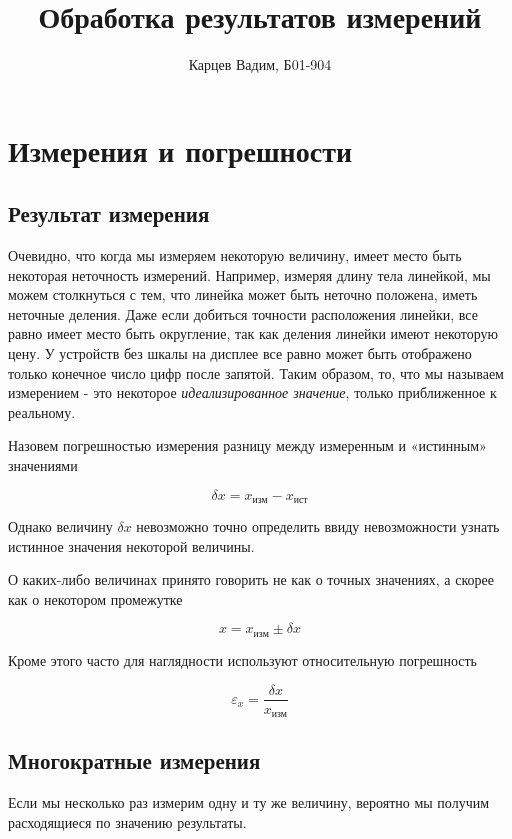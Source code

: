 \documentclass[12pt]{article}
\author{Карцев Вадим, Б01-904}            %
\title{Обработка результатов измерений}
\begin{document}
  \maketitle

  \newpage

  \section{Измерения и погрешности}

    \subsection{Результат измерения}

      Очевидно, что когда мы измеряем некоторую величину, имеет место быть некоторая
      неточность измерений. Например, измеряя длину тела линейкой, мы можем столкнуться
      с тем, что линейка может быть неточно положена, иметь неточные деления.
      Даже если добиться точности расположения линейки, все равно имеет место быть округление,
      так как деления линейки имеют некоторую цену. У устройств без шкалы на дисплее
      все равно может быть отображено только конечное число цифр после запятой.
      Таким образом, то, что мы называем измерением - это некоторое \textit{идеализированное значение},
      только приближенное к реальному.

      Назовем погрешностью измерения разницу между измеренным и «истинным» значениями

      $$
        \delta x = x_{изм} - x_{ист}
      $$

      Однако величину $\delta x$ невозможно точно определить ввиду невозможности
      узнать истинное значения некоторой величины.

      О каких-либо величинах принято говорить не как о точных значениях, а скорее
      как о некотором промежутке

      $$
        x = x_{изм} \pm \delta x
      $$

      Кроме этого часто для наглядности используют относительную погрешность

      $$
        \varepsilon_x = \frac{\delta x}{x_{изм}}
      $$

    \subsection{Многократные измерения}

      Если мы несколько раз измерим одну и ту же величину, вероятно мы получим
      расходящиеся по значению результаты.
\end{document}
